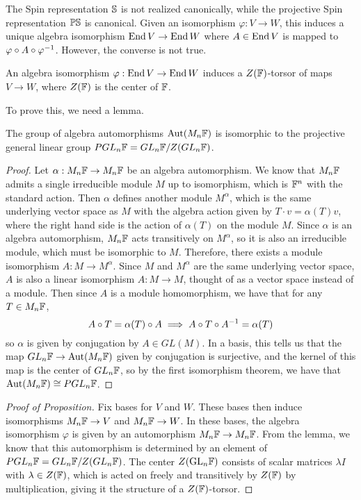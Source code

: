 The Spin representation $\S$ is not realized canonically,
while the projective Spin representation $\P\S$ is canonical. Given
an isomorphism $\varphi : V \to W$, this induces a unique algebra isomorphism
$\End V \to \End W$ where $A \in \End V$ is mapped to
$\varphi \circ A \circ \varphi\inv$. However, the converse is not true.
%
\begin{prop}
 An algebra isomorphism $\varphi : \End V \to \End W$ induces a $Z(\F)$-torsor
 of maps $V \to W$, where $Z(\F)$ is the center of $\F$.
\end{prop}
%
To prove this, we need a lemma.
%
\begin{lem}
 The group of algebra automorphisms $\Aut(M_n\F)$ is isomorphic to the
 projective general linear group $PGL_n\F = GL_n\F / Z(GL_n\F)$.
\end{lem}
%
\begin{proof}
 Let $\alpha : M_n\F \to M_n\F$ be an algebra automorphism. We know that
 $M_n\F$ admits a single irreducible module $M$ up to isomorphism,
 which is $\F^n$ with the standard action. Then $\alpha$ defines another module
 $M^\alpha$, which is the same underlying vector space as $M$ with the algebra
 action given by $T \cdot v = \alpha(T)v$, where the right hand side is the action of
 $\alpha(T)$ on the module $M$. Since $\alpha$ is an algebra automorphism,
 $M_n\F$ acts transitively on $M^\alpha$, so it is also an irreducible module,
 which must be isomorphic to $M$. Therefore, there exists a module isomorphism
 $A : M \to M^\alpha$. Since $M$ and $M^\alpha$ are the same underlying vector
 space, $A$ is also a linear isomorphism $A : M \to M$, thought of as a vector space
 instead of a module. Then since $A$ is a module homomorphism, we have that
 for any $T \in M_n\F$,
 \[
  A \circ T = \alpha(T) \circ A \implies A \circ T \circ A\inv = \alpha(T)
 \]
 so $\alpha$ is given by conjugation by $A \in GL(M)$. In a basis, this
 tells us that the map $GL_n\F \to \Aut(M_n\F)$ given by conjugation is surjective,
 and the kernel of this map is the center of $GL_n\F$, so by the first isomorphism
 theorem, we have that $\Aut(M_n\F) \cong PGL_n\F$.
\end{proof}
%
\begin{proof}[Proof of Proposition]
 Fix bases for $V$ and $W$. These bases then induce isomorphisms
 $M_n\F \to V$ and $M_n\F \to W$. In these bases, the algebra
 isomorphism $\varphi$ is given by an automorphism $M_n\F \to M_n\F$. From the
 lemma, we know that this automorphism is determined by an element of
 $PGL_n\F = GL_n\F / Z(GL_n\F)$. The center $Z(\GL_n\F)$ consists of
 scalar matrices $\lambda I$ with $\lambda \in Z(\F)$, which is acted on
 freely and transitively by $Z(\F)$ by multiplication, giving it the structure
 of a $Z(\F)$-torsor.
\end{proof}

